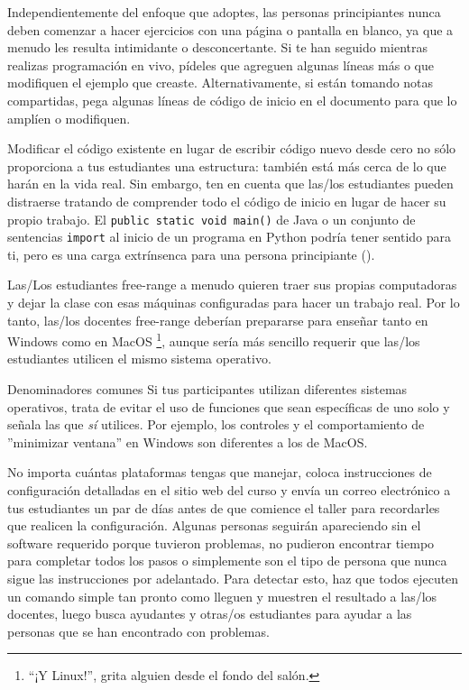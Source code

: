 Independientemente del enfoque que adoptes,
las personas principiantes nunca deben comenzar a hacer ejercicios con una página o pantalla en blanco,
ya que a menudo les resulta intimidante o desconcertante.
Si te han seguido mientras realizas programación en vivo,
pídeles que agreguen algunas líneas más
o que modifiquen el ejemplo que creaste.
Alternativamente, si están tomando notas compartidas,
pega algunas líneas de código de inicio en el documento
para que lo amplíen o modifiquen.

Modificar el código existente en lugar de escribir código nuevo desde cero
no sólo proporciona a tus estudiantes una estructura:
también está más cerca de lo que harán en la vida real.
Sin embargo,
ten en cuenta que las/los estudiantes pueden distraerse tratando de comprender todo el código de inicio
en lugar de hacer su propio trabajo.
El \texttt{public static void main()} de Java
o un conjunto de sentencias \texttt{import} al inicio de un programa en Python
podría tener sentido para ti,
pero es una carga extrínsenca para una persona principiante ().


Las/Los estudiantes free-range a menudo quieren traer sus propias computadoras
y dejar la clase con esas máquinas configuradas para hacer un trabajo real.
Por lo tanto, las/los docentes free-range deberían prepararse para enseñar tanto en Windows como en MacOS \footnote{``¡Y Linux!'', grita alguien desde el fondo del salón.},
aunque sería más sencillo requerir que las/los estudiantes utilicen el mismo sistema operativo.

\begin{aside}{Denominadores comunes}
  Si tus participantes utilizan diferentes sistemas operativos,
  trata de evitar el uso de funciones que sean específicas de uno solo
  y señala las que \emph{sí} utilices.
  Por ejemplo,
  los controles y el comportamiento de ''minimizar ventana'' en Windows son diferentes
  a los de MacOS.
\end{aside}

No importa cuántas plataformas tengas que manejar,
coloca instrucciones de configuración detalladas en el sitio web del curso
y envía un correo electrónico a tus estudiantes un par de días antes de que comience el taller
para recordarles que realicen la configuración.
Algunas personas seguirán apareciendo sin el software requerido porque
tuvieron problemas,
no pudieron encontrar tiempo para completar todos los pasos
o simplemente son el tipo de persona que nunca sigue las instrucciones por adelantado.
Para detectar esto,
haz que todos ejecuten un comando simple tan pronto como lleguen
y muestren el resultado a las/los docentes,
luego busca ayudantes y otras/os estudiantes
para ayudar a las personas que se han encontrado con problemas.

